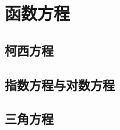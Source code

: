 
\section{函数方程}
\label{sec:function-equation}

\subsection{柯西方程}
\label{sec:cauchy-function-equality}

\subsection{指数方程与对数方程}
\label{sec:exponent-equation-and-logarithm-equation}

\subsection{三角方程}
\label{sec:triangle-function-equation}




